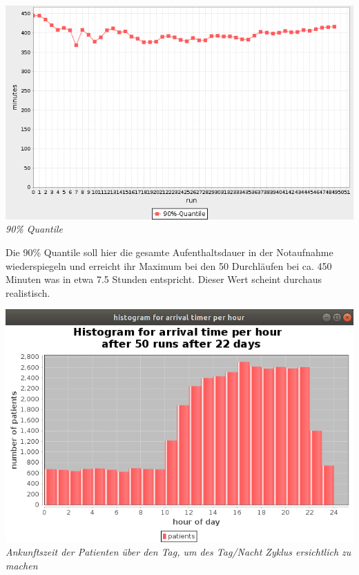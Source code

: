 \documentclass{article}
\begin{document}
\begin{center}
\includegraphics[scale=0.4]{img/quantile.png}\\
\textit{90\% Quantile}\\
\end{center}
\vspace{\baselineskip}
Die 90\% Quantile soll hier die gesamte Aufenthaltsdauer in der Notaufnahme wiederspiegeln und erreicht ihr Maximum bei den 50 Durchläufen bei ca. 450 Minuten was in etwa 7.5 Stunden entspricht. Dieser Wert scheint durchaus realistisch.

\begin{center}
\includegraphics[scale=0.4]{img/day_night.png}\\
\textit{Ankunftszeit der Patienten über den Tag, um des Tag/Nacht Zyklus ersichtlich zu machen}
\end{center}
\vspace{\baselineskip}
\end{document}
